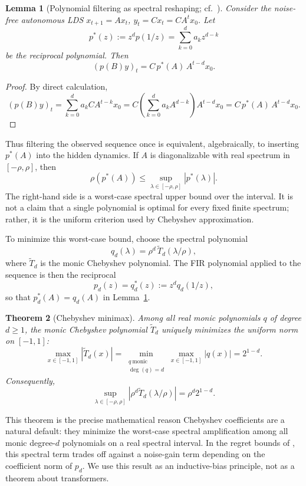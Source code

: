 \documentclass[11pt]{article}
\theoremstyle{plain}
\newtheorem{theorem}{Theorem}[section]
\newtheorem{lemma}[theorem]{Lemma}
\theoremstyle{definition}
\theoremstyle{remark}
\newcommand{\abs}[1]{\left\lvert#1\right\rvert}
\begin{document}
\begin{lemma}[Polynomial filtering as spectral reshaping; cf.\ {\citet{marsden2024universal}}]
\label{lem:polynomial-identity}
Consider the noise-free autonomous LDS $x_{t+1}=Ax_t$, $y_t=Cx_t=C A^t x_0$. Let
\[
    p^*(z):=z^d p(1/z)=\sum_{k=0}^{d} a_k z^{d-k}
\]
be the reciprocal polynomial. Then
\begin{equation}
    (p(B)y)_t
    =
    C\,p^*(A)\,A^{t-d}x_0.
    \label{eq:poly-identity}
\end{equation}
\end{lemma}

\begin{proof}
By direct calculation,
\[
    (p(B)y)_t
    =
    \sum_{k=0}^{d} a_k C A^{t-k}x_0
    =
    C\left(\sum_{k=0}^{d}a_k A^{d-k}\right)A^{t-d}x_0
    =
    C\,p^*(A)\,A^{t-d}x_0.
\]
\end{proof}

Thus filtering the observed sequence once is equivalent, algebraically, to inserting $p^*(A)$ into the hidden dynamics. If $A$ is diagonalizable with real spectrum in $[-\rho,\rho]$, then
\[
    \rho(p^*(A))
    \le
    \sup_{\lambda\in[-\rho,\rho]}\abs{p^*(\lambda)}.
\]
The right-hand side is a worst-case spectral upper bound over the interval. It is not a claim that a single polynomial is optimal for every fixed finite spectrum; rather, it is the uniform criterion used by Chebyshev approximation.

To minimize this worst-case bound, choose the spectral polynomial
\[
    q_d(\lambda)=\rho^d\,\tilde T_d(\lambda/\rho),
\]
where $\tilde T_d$ is the monic Chebyshev polynomial. The FIR polynomial applied to the sequence is then the reciprocal
\[
    p_d(z)=q_d^*(z):=z^d q_d(1/z),
\]
so that $p_d^*(A)=q_d(A)$ in Lemma~\ref{lem:polynomial-identity}.

\begin{theorem}[Chebyshev minimax]
\label{thm:chebyshev-minimax-prelim}
Among all real monic polynomials $q$ of degree $d\ge1$, the monic Chebyshev polynomial $\tilde T_d$ uniquely minimizes the uniform norm on $[-1,1]$:
\[
    \max_{x\in[-1,1]}\abs{\tilde T_d(x)}
    =
    \min_{\substack{q\ \mathrm{monic}\\ \deg(q)=d}}
    \max_{x\in[-1,1]}\abs{q(x)}
    =
    2^{1-d}.
\]
Consequently,
\[
    \sup_{\lambda\in[-\rho,\rho]}\abs{\rho^d\tilde T_d(\lambda/\rho)}
    =
    \rho^d 2^{1-d}.
\]
\end{theorem}

This theorem is the precise mathematical reason Chebyshev coefficients are a natural default: they minimize the worst-case spectral amplification among all monic degree-$d$ polynomials on a real spectral interval. In the regret bounds of \citet{marsden2024universal}, this spectral term trades off against a noise-gain term depending on the coefficient norm of $p_d$. We use this result as an inductive-bias principle, not as a theorem about transformers.
\end{document}
